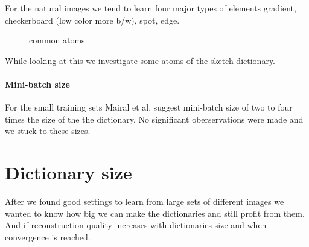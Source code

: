 For the natural images we tend to learn four major types of elements gradient,
checkerboard (low color more b/w), spot, edge.

\begin{figure}[h]
\centering
{}
\hspace{5mm}
\hspace{5mm}
\hspace{5mm}
\hspace{5mm}
\caption{common atoms}
\end{figure}

While looking at this we investigate some atoms of the sketch dictionary.

\paragraph{Mini-batch size}
For the small training sets Mairal et al. suggest mini-batch size of two to four
times the size of the the dictionary. No significant oberservations were made
and we stuck to these sizes. 

\newpage
\section{Dictionary size}
After we found good settings to learn from large sets of different images we
wanted to know how big we can make the dictionaries and still profit from them.
And if reconstruction quality increases with dictionaries size and when
convergence is reached. 

